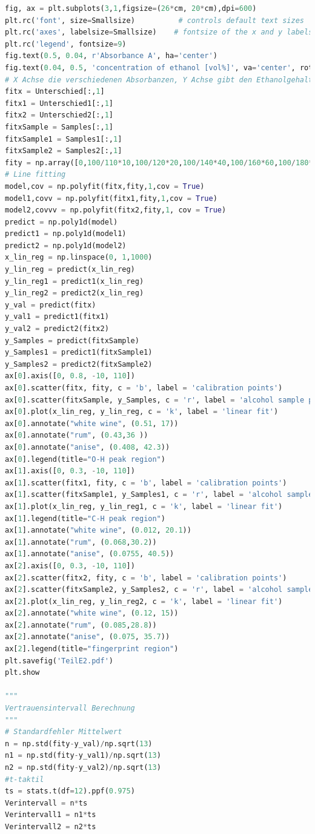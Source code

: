 \documentclass[a4paper,abstracton]{article}	                       %
\begin{document}
\begin{lstlisting}[language=Python]
fig, ax = plt.subplots(3,1,figsize=(26*cm, 20*cm),dpi=600)  
plt.rc('font', size=Smallsize)          # controls default text sizes
plt.rc('axes', labelsize=Smallsize)    # fontsize of the x and y labels
plt.rc('legend', fontsize=9)  
fig.text(0.5, 0.04, r'Absorbance A', ha='center')
fig.text(0.04, 0.5, 'concentration of ethanol [vol%]', va='center', rotation='vertical')
# X Achse die verschiedenen Absorbanzen, Y Achse gibt den Ethanolgehalt
fitx = Unterschied[:,1]
fitx1 = Unterschied1[:,1]
fitx2 = Unterschied2[:,1]
fitxSample = Samples[:,1]
fitxSample1 = Samples1[:,1]
fitxSample2 = Samples2[:,1]
fity = np.array([0,100/110*10,100/120*20,100/140*40,100/160*60,100/180*80,100/190*90,50,100/250*150,100/300*200,100/400*300,100/500*400,100])
# Line fitting 
model,cov = np.polyfit(fitx,fity,1,cov = True)
model1,covv = np.polyfit(fitx1,fity,1,cov = True)
model2,covvv = np.polyfit(fitx2,fity,1, cov = True)
predict = np.poly1d(model)
predict1 = np.poly1d(model1)
predict2 = np.poly1d(model2)
x_lin_reg = np.linspace(0, 1,1000)
y_lin_reg = predict(x_lin_reg)
y_lin_reg1 = predict1(x_lin_reg)
y_lin_reg2 = predict2(x_lin_reg)
y_val = predict(fitx)
y_val1 = predict1(fitx1)
y_val2 = predict2(fitx2)
y_Samples = predict(fitxSample)
y_Samples1 = predict1(fitxSample1)
y_Samples2 = predict2(fitxSample2)
ax[0].axis([0, 0.8, -10, 110])
ax[0].scatter(fitx, fity, c = 'b', label = 'calibration points')
ax[0].scatter(fitxSample, y_Samples, c = 'r', label = 'alcohol sample points')
ax[0].plot(x_lin_reg, y_lin_reg, c = 'k', label = 'linear fit')
ax[0].annotate("white wine", (0.51, 17))
ax[0].annotate("rum", (0.43,36 ))
ax[0].annotate("anise", (0.408, 42.3))
ax[0].legend(title="O-H peak region")
ax[1].axis([0, 0.3, -10, 110])
ax[1].scatter(fitx1, fity, c = 'b', label = 'calibration points')
ax[1].scatter(fitxSample1, y_Samples1, c = 'r', label = 'alcohol sample points')
ax[1].plot(x_lin_reg, y_lin_reg1, c = 'k', label = 'linear fit')
ax[1].legend(title="C-H peak region")
ax[1].annotate("white wine", (0.012, 20.1))
ax[1].annotate("rum", (0.068,30.2))
ax[1].annotate("anise", (0.0755, 40.5))
ax[2].axis([0, 0.3, -10, 110])
ax[2].scatter(fitx2, fity, c = 'b', label = 'calibration points')
ax[2].scatter(fitxSample2, y_Samples2, c = 'r', label = 'alcohol sample points')
ax[2].plot(x_lin_reg, y_lin_reg2, c = 'k', label = 'linear fit')
ax[2].annotate("white wine", (0.12, 15))
ax[2].annotate("rum", (0.085,28.8))
ax[2].annotate("anise", (0.075, 35.7))
ax[2].legend(title="fingerprint region")
plt.savefig('TeilE2.pdf')
plt.show

"""
Vertrauensintervall Berechnung 
"""
# Standardfehler Mittelwert
n = np.std(fity-y_val)/np.sqrt(13)
n1 = np.std(fity-y_val1)/np.sqrt(13)
n2 = np.std(fity-y_val2)/np.sqrt(13)
#t-taktil 
ts = stats.t(df=12).ppf(0.975)
Verintervall = n*ts 
Verintervall1 = n1*ts 
Verintervall2 = n2*ts 


\end{lstlisting}
\end{document}
